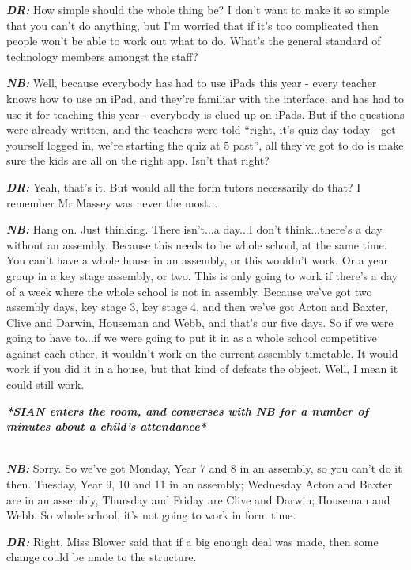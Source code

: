 \textit{\textbf{DR:}} How simple should the whole thing be? I don't want to make it so simple that you can't do anything, but I'm worried that if it's too complicated then people won't be able to work out what to do. What's the general standard of technology members amongst the staff?

\textit{\textbf{NB:}} Well, because everybody has had to use iPads this year - every teacher knows how to use an iPad, and they're familiar with the interface, and has had to use it for teaching this year - everybody is clued up on iPads. But if the questions were already written, and the teachers were told ``right, it's quiz day today - get yourself logged in, we're starting the quiz at 5 past'', all they've got to do is make sure the kids are all on the right app. Isn't that right?

\textit{\textbf{DR:}} Yeah, that's it. But would all the form tutors necessarily do that? I remember Mr Massey was never the most...

\textit{\textbf{NB:}} Hang on. Just thinking. There isn't...a day...I don't think...there's a day without an assembly. Because this needs to be whole school, at the same time. You can't have a whole house in an assembly, or this wouldn't work. Or a year group in a key stage assembly, or two. This is only going to work if there's a day of a week where the whole school is not in assembly. Because we've got two assembly days, key stage 3, key stage 4, and then we've got Acton and Baxter, Clive and Darwin, Houseman and Webb, and that's our five days. So if we were going to have to...if we were going to put it in as a whole school competitive against each other, it wouldn't work on the current assembly timetable. It would work if you did it in a house, but that kind of defeats the object. Well, I mean it could still work.\\

\begin{center}
\textit{\textbf{*SIAN enters the room, and converses with NB for a number of minutes about a child's attendance*}}
\end{center}

\textit{\textbf{\\NB:}} Sorry. So we've got Monday, Year 7 and 8 in an assembly, so you can't do it then. Tuesday, Year 9, 10 and 11 in an assembly; Wednesday Acton and Baxter are in an assembly, Thursday and Friday are Clive and Darwin; Houseman and Webb. So whole school, it's not going to work in form time.

\textit{\textbf{DR:}} Right. Miss Blower said that if a big enough deal was made, then some change could be made to the structure.

